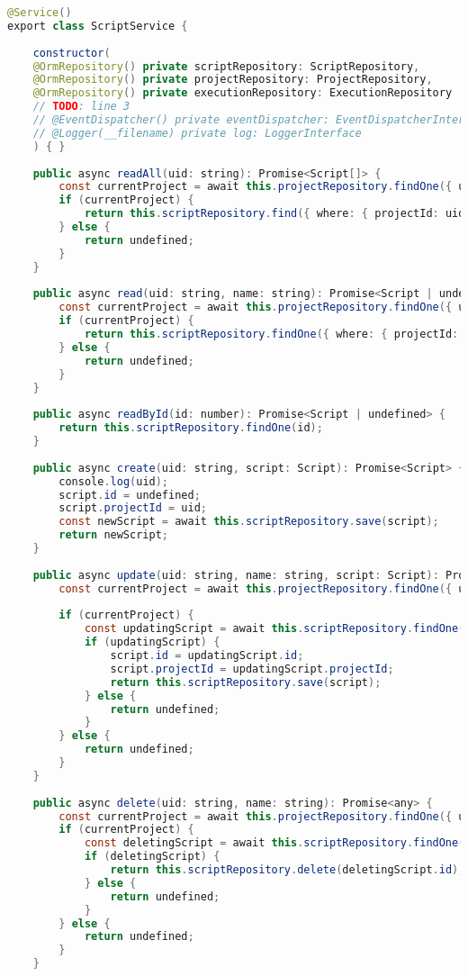 \begin{lstlisting}[language=java]
@Service()
export class ScriptService {
	
	constructor(
	@OrmRepository() private scriptRepository: ScriptRepository,
	@OrmRepository() private projectRepository: ProjectRepository,
	@OrmRepository() private executionRepository: ExecutionRepository
	// TODO: line 3
	// @EventDispatcher() private eventDispatcher: EventDispatcherInterface,
	// @Logger(__filename) private log: LoggerInterface
	) { }
	
	public async readAll(uid: string): Promise<Script[]> {
		const currentProject = await this.projectRepository.findOne({ uid });
		if (currentProject) {
			return this.scriptRepository.find({ where: { projectId: uid }, relations: ['executions'] });
		} else {
			return undefined;
		}
	}
	
	public async read(uid: string, name: string): Promise<Script | undefined> {
		const currentProject = await this.projectRepository.findOne({ uid });
		if (currentProject) {
			return this.scriptRepository.findOne({ where: { projectId: uid, name } });
		} else {
			return undefined;
		}
	}
	
	public async readById(id: number): Promise<Script | undefined> {
		return this.scriptRepository.findOne(id);
	}
	
	public async create(uid: string, script: Script): Promise<Script> {
		console.log(uid);
		script.id = undefined;
		script.projectId = uid;
		const newScript = await this.scriptRepository.save(script);
		return newScript;
	}
	
	public async update(uid: string, name: string, script: Script): Promise<Script> {
		const currentProject = await this.projectRepository.findOne({ uid });
		
		if (currentProject) {
			const updatingScript = await this.scriptRepository.findOne({ where: { name } });
			if (updatingScript) {
				script.id = updatingScript.id;
				script.projectId = updatingScript.projectId;
				return this.scriptRepository.save(script);
			} else {
				return undefined;
			}
		} else {
			return undefined;
		}
	}
	
	public async delete(uid: string, name: string): Promise<any> {
		const currentProject = await this.projectRepository.findOne({ uid });
		if (currentProject) {
			const deletingScript = await this.scriptRepository.findOne({ where: { projectId: uid, name } });
			if (deletingScript) {
				return this.scriptRepository.delete(deletingScript.id);
			} else {
				return undefined;
			}
		} else {
			return undefined;
		}
	}
	

\end{lstlisting}
